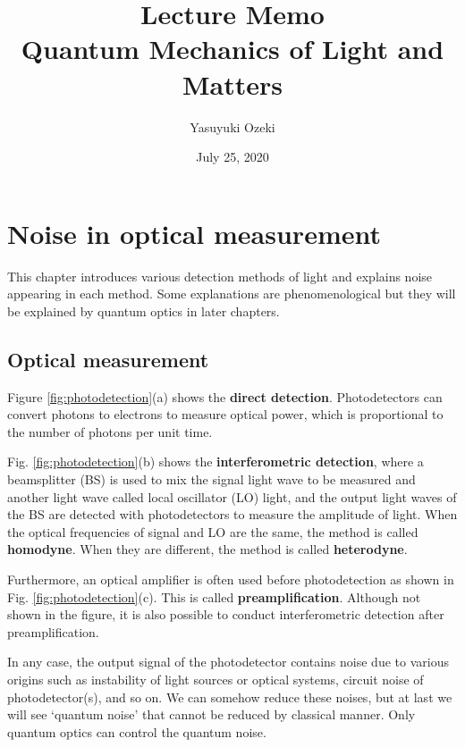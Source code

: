 \documentclass{book}
\begin{document}
\title{Lecture Memo \\ Quantum Mechanics of Light and Matters}
\author{Yasuyuki Ozeki}
\date{July 25, 2020}

\maketitle
\tableofcontents
\mainmatter




\chapter{Noise in optical measurement}
This chapter introduces various detection methods of light and explains noise appearing in each method. Some explanations are phenomenological but they will be explained by quantum optics in later chapters.

\section{Optical measurement}
Figure \ref{fig:photodetection}(a) shows the \textbf{direct detection}. Photodetectors can convert photons to electrons to measure optical power, which is proportional to the number of photons per unit time. 

Fig. \ref{fig:photodetection}(b) shows the \textbf{interferometric detection}, where a beamsplitter (BS) is used to mix the signal light wave to be measured and another light wave called local oscillator (LO) light, and the output light waves of the BS are detected with photodetectors to measure the amplitude of light. When the optical frequencies of signal and LO are the same, the method is called \textbf{homodyne}. When they are different, the method is called \textbf{heterodyne}.

Furthermore, an optical amplifier is often used before photodetection as shown in Fig. \ref{fig:photodetection}(c). This is called \textbf{preamplification}. Although not shown in the figure, it is also possible to conduct interferometric detection after preamplification. 

In any case, the output signal of the photodetector contains noise due to various origins such as instability of light sources or optical systems, circuit noise of photodetector(s), and so on. We can somehow reduce these noises, but at last we will see `quantum noise' that cannot be reduced by classical manner. Only quantum optics can control the quantum noise.
\end{document}
